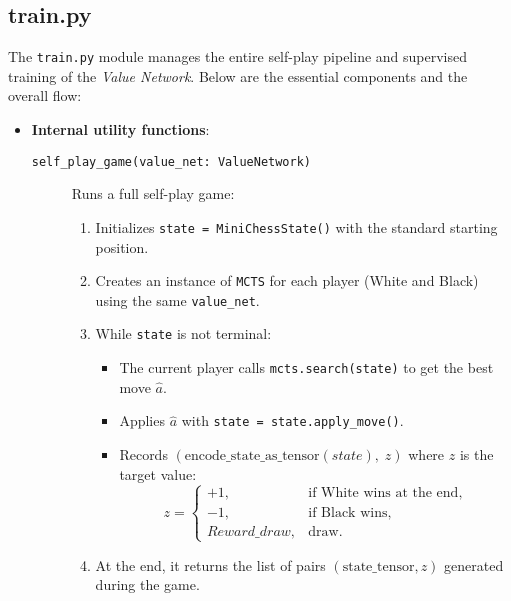 \documentclass{report}
\begin{document}
\subsection{train.py}
\label{sec:train_py}
The \texttt{train.py} module manages the entire self-play pipeline and supervised training of the \textit{Value Network}. Below are the essential components and the overall flow:

\begin{itemize}
  \item \textbf{Internal utility functions}:
    \begin{description}
      \item[\texttt{self\_play\_game(value\_net: ValueNetwork)}]  
        Runs a full self-play game:
        \begin{enumerate}
          \item Initializes \texttt{state = MiniChessState()} with the standard starting position.
          \item Creates an instance of \texttt{MCTS} for each player (White and Black) using the same \texttt{value\_net}.
          \item While \texttt{state} is not terminal:
            \begin{itemize}
              \item The current player calls \texttt{mcts.search(state)} to get the best move \(\hat{a}\).
              \item Applies \(\hat{a}\) with \texttt{state = state.apply\_move()}.
              \item Records \((\text{encode\_state\_as\_tensor}(state), \; z)\) where \(z\) is the target value:
                \[
                  z = 
                  \begin{cases}
                    +1, & \text{if White wins at the end}, \\
                    -1, & \text{if Black wins}, \\
                    Reward\_draw, & \text{draw}.
                  \end{cases}
                \]
            \end{itemize}
          \item At the end, it returns the list of pairs \((\text{state\_tensor}, z)\) generated during the game.
        \end{enumerate}


\end{description}
\end{itemize}
\end{document}
